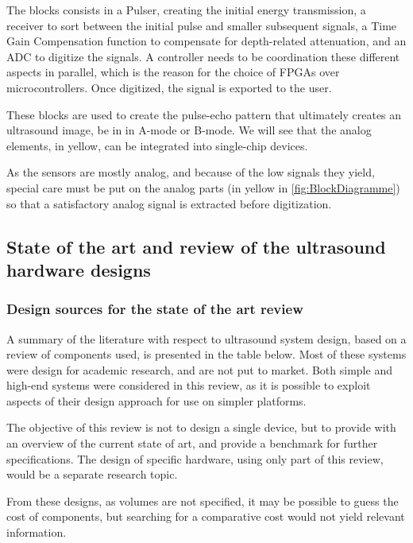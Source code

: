 \documentclass{article}
\begin{document}
The blocks consists in a Pulser, creating the initial energy transmission, a receiver to sort between the initial pulse and smaller subsequent signals, a Time Gain Compensation function to compensate for depth-related attenuation, and an ADC to digitize the signals. A controller needs to be coordination these different aspects in parallel, which is the reason for the choice of FPGAs over microcontrollers. Once digitized, the signal is exported to the user.

These blocks are used to create the pulse-echo pattern that ultimately creates an ultrasound image, be in in A-mode or B-mode. We will see that the analog elements, in yellow, can be integrated into single-chip devices.

As the sensors are mostly analog, and because of the low signals they yield, special care must be put on the analog parts (in yellow in \ref{fig:BlockDiagramme}) so that a satisfactory analog signal is extracted before digitization.




\subsection{State of the art and review of the ultrasound hardware designs}

\subsubsection{Design sources for the state of the art review}

A summary of the literature with respect to ultrasound system design, based on a review of components used, is presented in the table below. Most of these systems were design for academic research, and are not put to market. Both simple and high-end systems were considered in this review, as it is possible to exploit aspects of their design approach for use on simpler platforms. 

The objective of this review is not to design a single device, but to provide with an overview of the current state of art, and provide a benchmark for further specifications. The design of specific hardware, using only part of this review, would be a separate research topic.



From these designs, as volumes are not specified, it may be possible to guess the cost of components, but searching for a comparative cost would not yield relevant information.
\end{document}
